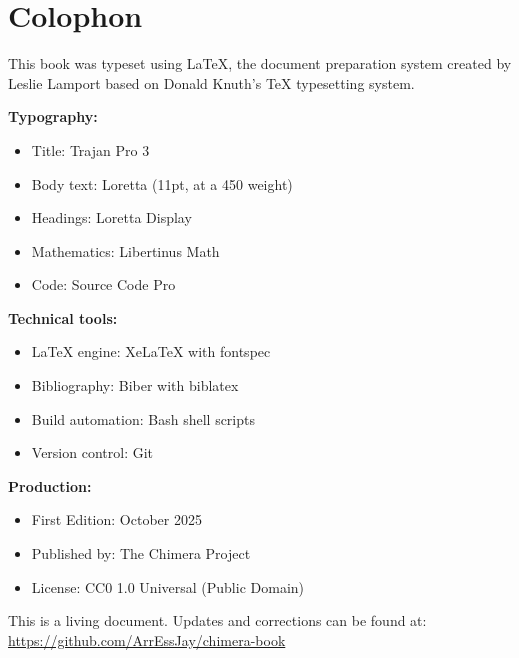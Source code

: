 
\chapter*{Colophon}

This book was typeset using \LaTeX{}, the document preparation system created by Leslie Lamport based on Donald Knuth's \TeX{} typesetting system.

\textbf{Typography:}
\begin{itemize}
\item Title: Trajan Pro 3
\item Body text: Loretta (11pt, at a 450 weight)
\item Headings: Loretta Display
\item Mathematics: Libertinus Math
\item Code: Source Code Pro
\end{itemize}

\textbf{Technical tools:}
\begin{itemize}
\item \LaTeX{} engine: Xe\LaTeX{} with fontspec
\item Bibliography: Biber with biblatex
\item Build automation: Bash shell scripts
\item Version control: Git
\end{itemize}

\textbf{Production:}
\begin{itemize}
\item First Edition: October 2025
\item Published by: The Chimera Project
\item License: CC0 1.0 Universal (Public Domain)
\end{itemize}

This is a living document. Updates and corrections can be found at:\\
\url{https://github.com/ArrEssJay/chimera-book}
